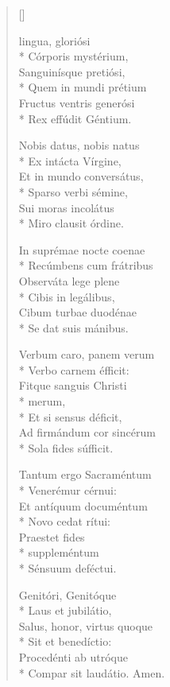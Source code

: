 \newHymn
{}

\pointtrans

\begin{multicols}{2}
\begin{verse}[\versewidth]

 lingua, gloriósi \\*
Córporis mystérium,     \\ 
Sanguinísque pretiósi,    \\*  
Quem in mundi prétium     \\
Fructus ventris generósi    \\*
Rex effúdit Géntium.        
\pointtrans                            

Nobis datus, nobis natus    \\*
Ex intácta Vírgine,         \\
Et in mundo conversátus,    \\*
Sparso verbi sémine,        \\
Sui moras incolátus         \\*
Miro clausit órdine.        
                            

In suprémae nocte coenae     \\*
Recúmbens cum frátribus     \\
Observáta lege plene        \\*
Cibis in legálibus,         \\
Cibum turbae duodénae       \\*
Se dat suis mánibus.        

Verbum caro, panem verum    \\*
Verbo carnem éfficit:       \\
Fitque sanguis Christi \\*
\qquad merum, \\*
Et si sensus déficit,       \\
Ad firmándum cor sincérum   \\*
Sola fides súfficit.        

Tantum ergo Sacraméntum     \\*
Venerémur cérnui:           \\
Et antíquum documéntum      \\*
Novo cedat rítui:           \\
Praestet fides\\*
\qquad suppleméntum \\*
Sénsuum deféctui.           

Genitóri, Genitóque         \\*
Laus et jubilátio,          \\
Salus, honor, virtus quoque \\*
Sit et benedíctio:          \\
Procedénti ab utróque       \\*
Compar sit laudátio.
Amen. %

\end{verse}
\end{multicols}

